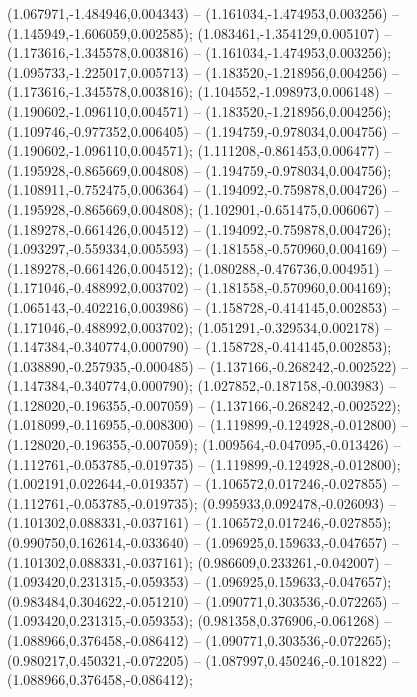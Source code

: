  (1.067971,-1.484946,0.004343) -- (1.161034,-1.474953,0.003256) -- (1.145949,-1.606059,0.002585);
 (1.083461,-1.354129,0.005107) -- (1.173616,-1.345578,0.003816) -- (1.161034,-1.474953,0.003256);
 (1.095733,-1.225017,0.005713) -- (1.183520,-1.218956,0.004256) -- (1.173616,-1.345578,0.003816);
 (1.104552,-1.098973,0.006148) -- (1.190602,-1.096110,0.004571) -- (1.183520,-1.218956,0.004256);
 (1.109746,-0.977352,0.006405) -- (1.194759,-0.978034,0.004756) -- (1.190602,-1.096110,0.004571);
 (1.111208,-0.861453,0.006477) -- (1.195928,-0.865669,0.004808) -- (1.194759,-0.978034,0.004756);
 (1.108911,-0.752475,0.006364) -- (1.194092,-0.759878,0.004726) -- (1.195928,-0.865669,0.004808);
 (1.102901,-0.651475,0.006067) -- (1.189278,-0.661426,0.004512) -- (1.194092,-0.759878,0.004726);
 (1.093297,-0.559334,0.005593) -- (1.181558,-0.570960,0.004169) -- (1.189278,-0.661426,0.004512);
 (1.080288,-0.476736,0.004951) -- (1.171046,-0.488992,0.003702) -- (1.181558,-0.570960,0.004169);
 (1.065143,-0.402216,0.003986) -- (1.158728,-0.414145,0.002853) -- (1.171046,-0.488992,0.003702);
 (1.051291,-0.329534,0.002178) -- (1.147384,-0.340774,0.000790) -- (1.158728,-0.414145,0.002853);
 (1.038890,-0.257935,-0.000485) -- (1.137166,-0.268242,-0.002522) -- (1.147384,-0.340774,0.000790);
 (1.027852,-0.187158,-0.003983) -- (1.128020,-0.196355,-0.007059) -- (1.137166,-0.268242,-0.002522);
 (1.018099,-0.116955,-0.008300) -- (1.119899,-0.124928,-0.012800) -- (1.128020,-0.196355,-0.007059);
 (1.009564,-0.047095,-0.013426) -- (1.112761,-0.053785,-0.019735) -- (1.119899,-0.124928,-0.012800);
 (1.002191,0.022644,-0.019357) -- (1.106572,0.017246,-0.027855) -- (1.112761,-0.053785,-0.019735);
 (0.995933,0.092478,-0.026093) -- (1.101302,0.088331,-0.037161) -- (1.106572,0.017246,-0.027855);
 (0.990750,0.162614,-0.033640) -- (1.096925,0.159633,-0.047657) -- (1.101302,0.088331,-0.037161);
 (0.986609,0.233261,-0.042007) -- (1.093420,0.231315,-0.059353) -- (1.096925,0.159633,-0.047657);
 (0.983484,0.304622,-0.051210) -- (1.090771,0.303536,-0.072265) -- (1.093420,0.231315,-0.059353);
 (0.981358,0.376906,-0.061268) -- (1.088966,0.376458,-0.086412) -- (1.090771,0.303536,-0.072265);
 (0.980217,0.450321,-0.072205) -- (1.087997,0.450246,-0.101822) -- (1.088966,0.376458,-0.086412);
